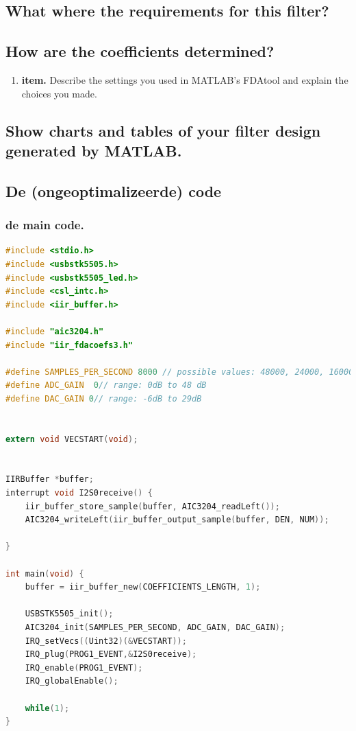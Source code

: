 \documentclass[11pt,a4paper]{article}
\newcommand\litem[1]{\item{\bfseries#1.\space}}
\begin{document}
	\subsection{What where the requirements for this filter?}
	
	\subsection{How are the coefficients determined?}
	
	\begin{enumerate}[label=\emph{\alph*)}]
		\litem{item} Describe the settings you 					used in MATLAB’s FDAtool and explain the 					choices you made.
	\end{enumerate}

	\subsection{Show charts and tables of your filter design generated by MATLAB.}
	\subsection{De (ongeoptimalizeerde) code}

	\subsubsection{de main code.}
	\begin{lstlisting}[language=c]
#include <stdio.h>
#include <usbstk5505.h>
#include <usbstk5505_led.h>
#include <csl_intc.h>
#include <iir_buffer.h>

#include "aic3204.h"
#include "iir_fdacoefs3.h"

#define SAMPLES_PER_SECOND 8000 // possible values: 48000, 24000, 16000, 12000, 9600, and 8000
#define ADC_GAIN  0// range: 0dB to 48 dB
#define DAC_GAIN 0// range: -6dB to 29dB


extern void VECSTART(void);


IIRBuffer *buffer;
interrupt void I2S0receive() {
	iir_buffer_store_sample(buffer, AIC3204_readLeft());
	AIC3204_writeLeft(iir_buffer_output_sample(buffer, DEN, NUM));

}

int main(void) {
	buffer = iir_buffer_new(COEFFICIENTS_LENGTH, 1);

	USBSTK5505_init();
	AIC3204_init(SAMPLES_PER_SECOND, ADC_GAIN, DAC_GAIN);
	IRQ_setVecs((Uint32)(&VECSTART));
	IRQ_plug(PROG1_EVENT,&I2S0receive);
	IRQ_enable(PROG1_EVENT);
	IRQ_globalEnable();

	while(1);
}
	\end{lstlisting}
	\clearpage
	
\end{document}
